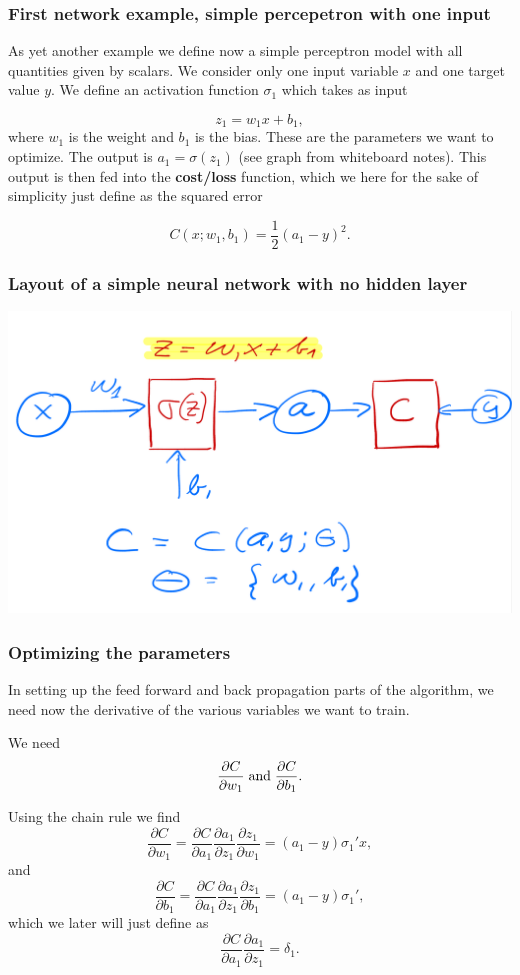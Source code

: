 \documentclass{beamer}
\begin{document}
\begin{frame}
\frametitle{First network example, simple percepetron with one input}

As yet another example we define now a simple perceptron model with
all quantities given by scalars. We consider only one input variable
$x$ and one target value $y$.  We define an activation function
$\sigma_1$ which takes as input

\[
z_1 = w_1x+b_1,
\]
where $w_1$ is the weight and $b_1$ is the bias. These are the
parameters we want to optimize.  The output is $a_1=\sigma(z_1)$ (see
graph from whiteboard notes). This output is then fed into the
\textbf{cost/loss} function, which we here for the sake of simplicity just
define as the squared error

\[
C(x;w_1,b_1)=\frac{1}{2}(a_1-y)^2.
\]
\end{frame}

\begin{frame}
\frametitle{Layout of a simple neural network with no hidden layer}

\vspace{6mm}

\centerline{\includegraphics[width=1.0\linewidth]{figures/simplenn1.png}}

\vspace{6mm}
\end{frame}

\begin{frame}
\frametitle{Optimizing the parameters}

In setting up the feed forward and back propagation parts of the
algorithm, we need now the derivative of the various variables we want
to train.

We need
\[
\frac{\partial C}{\partial w_1} \hspace{0.1cm}\mathrm{and}\hspace{0.1cm}\frac{\partial C}{\partial b_1}. 
\]

Using the chain rule we find 
\[
\frac{\partial C}{\partial w_1}=\frac{\partial C}{\partial a_1}\frac{\partial a_1}{\partial z_1}\frac{\partial z_1}{\partial w_1}=(a_1-y)\sigma_1'x,
\]
and
\[
\frac{\partial C}{\partial b_1}=\frac{\partial C}{\partial a_1}\frac{\partial a_1}{\partial z_1}\frac{\partial z_1}{\partial b_1}=(a_1-y)\sigma_1',
\]
which we later will just define as
\[
\frac{\partial C}{\partial a_1}\frac{\partial a_1}{\partial z_1}=\delta_1.
\]
\end{frame}
\end{document}
